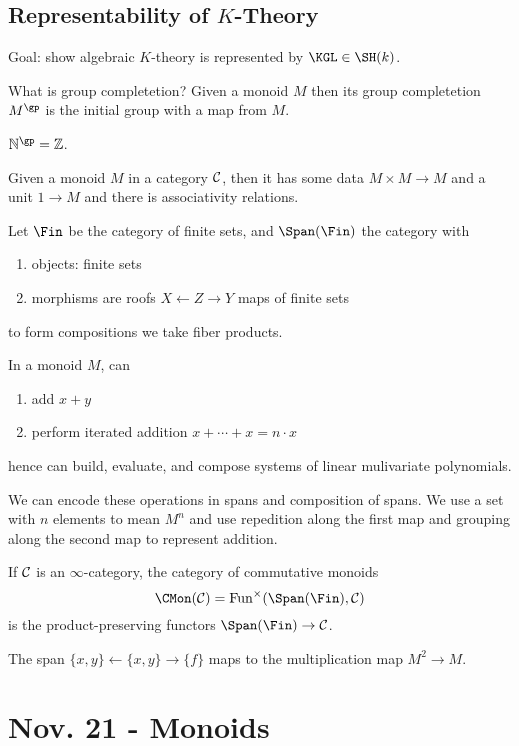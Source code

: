 \documentclass[12pt]{article}
\begin{document}
\subsection{Representability of $K$-Theory}

Goal: show algebraic $K$-theory is represented by $\KGL \in \SH(k)$. 


What is group completetion? Given a monoid $M$ then its group completetion $M^{\gp}$ is the initial group with a map from $M$. 

\begin{example}
$\N^{\gp} = \Z$. 
\end{example}

Given a monoid $M$ in a category $\mathcal{C}$, then it has some data $M \times M \to M$ and a unit $1 \to M$ and there is associativity relations. 
\par 
Let $\Fin$ be the category of finite sets, and $\Span(\Fin)$ the category with
\begin{enumerate}
\item objects: finite sets
\item morphisms are roofs $X \leftarrow Z \rightarrow Y$ maps of finite sets
\end{enumerate}
to form compositions we take fiber products. 

In a monoid $M$, can
\begin{enumerate}
\item add $x + y$
\item perform iterated addition $x + \cdots + x = n \cdot x$
\end{enumerate} 
hence can build, evaluate, and compose systems of linear mulivariate polynomials. 

We can encode these operations in spans and composition of spans. We use a set with $n$ elements to mean $M^{n}$ and use repedition along the first map and grouping along the second map to represent addition. 

\begin{defn}
If $\mathcal{C}$ is an $\infty$-category, the category of commutative monoids
\[ \CMon(\C) = \Fun^\times(\Span(\Fin), \C) \]
is the product-preserving functors $\Span(\Fin) \to \C$. 
\end{defn}

\begin{example}
The span $\{ x, y \} \leftarrow \{ x, y \} \to \{ f \}$ maps to the multiplication map $M^2 \to M$. 
\end{example}

\section{Nov. 21 - Monoids}
\end{document}
